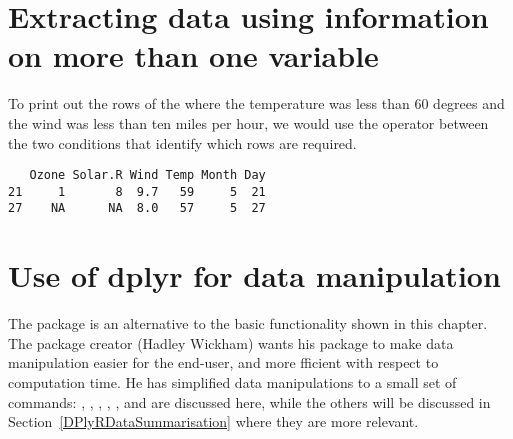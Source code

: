  
 
\section{Extracting data using information on more than one variable} 
 
To print out the rows of the    where the temperature was less than 60 degrees and the wind was less than ten miles per hour, we would use the \Roperator{\&} operator between the two conditions that identify which rows are required. 
\begin{knitrout}
\color{fgcolor}\begin{kframe}
\begin{alltt}
\hlstd{> }\hlstd{airquality[airquality}\hlopt{$}\hlopt{<}\hlopt{&}\hlopt{$}\hlopt{<}\hlstd{,]}
\end{alltt}
\begin{verbatim}
   Ozone Solar.R Wind Temp Month Day
21     1       8  9.7   59     5  21
27    NA      NA  8.0   57     5  27
\end{verbatim}
\end{kframe}
\end{knitrout}
 
 
\section{Use of dplyr for data manipulation} 
\label{DPlyRDataManipulation} 
 
The  package is an alternative to the basic \R{} functionality shown in this chapter. The package creator (Hadley Wickham) wants his package to make data manipulation easier for the end-user, and more fficient with respect to computation time. He has simplified data manipulations to a small set of commands: , , , , , and  are discussed here, while the others will be discussed in Section~\ref{DPlyRDataSummarisation}  where they are more relevant. 
 
